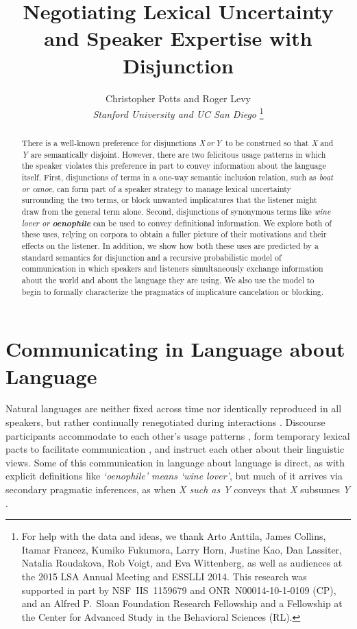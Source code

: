 \documentclass[12pt,twoside]{article}
\title{{\normalsize Negotiating Lexical Uncertainty and Speaker Expertise with Disjunction}}				%
\author{{\sc Christopher Potts and Roger Levy}\\ 						%
{\it Stanford University and UC San Diego}%
\footnote{For help with the data and ideas, we thank %
Arto Anttila, %
James Collins, %
Itamar Francez, %
Kumiko Fukumora, %
Larry Horn, %
Justine Kao, %
Dan Lassiter, %
Natalia Roudakova, %
Rob Voigt, and %
Eva Wittenberg, %
as well as audiences at the 2015 LSA Annual Meeting and ESSLLI 2014. %
This research was supported in part by NSF~IIS~1159679 and ONR~N00014-10-1-0109 (CP), %
and an Alfred P.~Sloan Foundation Research Fellowship and a Fellowship at the Center for Advanced Study in the Behavioral Sciences (RL).}} %
\date{}
\newcommand{\word}[1]{\emph{#1}}
\renewcommand{\_}{\textbf{\textunderscore\hspace{-4pt}\textunderscore\hspace{-3pt}\textunderscore\hspace{-4pt}\textunderscore}\hspace{0.5pt}}			%
\begin{document}
\maketitle
\thispagestyle{empty}	

\newcommand{\XorY}{\word{X\,or\,Y}}
\newcommand{\AorX}{\word{A\,or\,X}}

\begin{abstract}
  There is a well-known preference for disjunctions \XorY\ to be
  construed so that \word{X} and \word{Y} are semantically disjoint.
  However, there are two felicitous usage patterns in which the
  speaker violates this preference in part to convey information about
  the language itself.  First, disjunctions of terms in a one-way
  semantic inclusion relation, such as \word{boat or canoe}, can form
  part of a speaker strategy to manage lexical uncertainty surrounding
  the two terms, or block unwanted implicatures that the listener
  might draw from the general term alone. Second, disjunctions of
  synonymous terms like \word{wine lover or \textbf{oenophile}} can be
  used to convey definitional information. We explore both of these
  uses, relying on corpora to obtain a fuller picture of their
  motivations and their effects on the listener. In addition, we show
  how both these uses are predicted by a standard semantics for
  disjunction and a recursive probabilistic model of communication in
  which speakers and listeners simultaneously exchange information
  about the world and about the language they are using.  We also use
  the model to begin to formally characterize the pragmatics of
  implicature cancelation or blocking.
\end{abstract}
			


\section{Communicating in Language about Language}\label{sec:introduction}

Natural languages are neither fixed across time nor identically
reproduced in all speakers, but rather continually renegotiated during
interactions \citep{Clark97}. Discourse participants accommodate to
each other's usage patterns \citep{Giles:Coupland:Coupland:1991}, form
temporary lexical pacts to facilitate communication
\citep{Clark:Wilkes-Gibbs:1986,Brennan:Clark:1996}, and instruct each
other about their linguistic views. Some of this communication in
language about language is direct, as with explicit definitions like
\word{`oenophile' means `wine lover'}, but much of it arrives via
secondary pragmatic inferences, as when \word{X such as Y} conveys
that \word{X} subsumes \word{Y} \citep{Hearst92,SnowEtAl05}.
\end{document}
